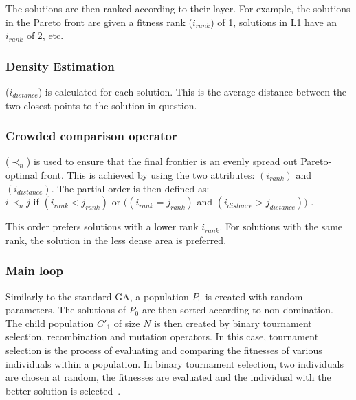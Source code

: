 \documentclass[sigconf]{acmart}
\begin{document}
The solutions are then ranked according to their layer. For example, the solutions in the Pareto front are given a fitness rank ($i_{rank}$) of 1, solutions in L1 have an $i_{rank}$ of 2, etc.

\subsubsection{Density Estimation}
($i_{distance}$) is calculated for each solution. This is the average distance between the two closest points to the solution in question. 


\subsubsection{Crowded comparison operator}
($\prec_n$) is used to ensure that the final frontier is an evenly spread out Pareto-optimal front. This is achieved by using the two attributes: $(i_{rank})$ and$(i_{distance})$. 
The partial order is then defined as:\\	
$i\prec_nj$ if $(i_{rank}<j_{rank})$ or $((i_{rank}=j_{rank})$ and  $(i_{distance}>j_{distance}))$ \cite{Valkanas2014}.

This order prefers solutions with a lower rank $i_{rank}$. For solutions with the same rank, the solution in the less dense area is preferred.

\subsubsection{Main loop}

Similarly to the standard GA, a population $P_{0}$ is created with random parameters. The solutions of $P_0$ are then sorted according to non-domination. The child population $C'_{1}$ of size $N$ is then created by binary tournament selection, recombination and mutation operators. In this case, tournament selection is the process of evaluating and comparing the fitnesses of various individuals within a population. In binary tournament selection, two individuals are chosen at random, the fitnesses are evaluated and the individual with the better solution is selected~\cite{AbdRahman2016}. 
\end{document}
